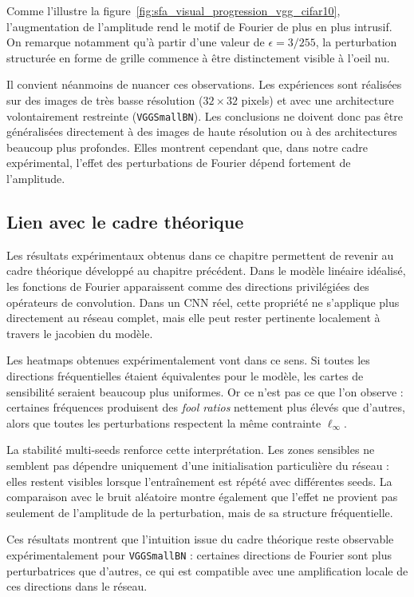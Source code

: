 Comme l'illustre la figure~\ref{fig:sfa_visual_progression_vgg_cifar10}, l'augmentation de l'amplitude rend le motif de 
Fourier de plus en plus intrusif. On remarque notamment qu'à partir d'une valeur de $\epsilon = 3/255$, la perturbation 
structurée en forme de grille commence à être distinctement visible à l'oeil nu. 

Il convient néanmoins de nuancer ces observations. Les expériences sont réalisées sur des images de
très basse résolution ($32\times32$ pixels) et avec une architecture volontairement restreinte
(\texttt{VGGSmallBN}). Les conclusions ne doivent donc pas être généralisées directement à des images
de haute résolution ou à des architectures beaucoup plus profondes. Elles montrent cependant que,
dans notre cadre expérimental, l'effet des perturbations de Fourier dépend fortement de l'amplitude.

\subsection{Lien avec le cadre théorique}
\label{subsec:discussion_lien_cadre_theorique}

Les résultats expérimentaux obtenus dans ce chapitre permettent de revenir au cadre théorique
développé au chapitre précédent. Dans le modèle linéaire idéalisé, les fonctions de Fourier apparaissent
comme des directions privilégiées des opérateurs de convolution. Dans un CNN réel, cette propriété
ne s'applique plus directement au réseau complet, mais elle peut rester pertinente localement à travers
le jacobien du modèle.

Les heatmaps obtenues expérimentalement vont dans ce sens. Si toutes les directions fréquentielles
étaient équivalentes pour le modèle, les cartes de sensibilité seraient beaucoup plus uniformes. Or ce
n'est pas ce que l'on observe : certaines fréquences produisent des \textit{fool ratios} nettement plus
élevés que d'autres, alors que toutes les perturbations respectent la même contrainte $\ell_\infty$.

La stabilité multi-seeds renforce cette interprétation. Les zones sensibles ne semblent pas dépendre
uniquement d'une initialisation particulière du réseau : elles restent visibles lorsque l'entraînement est
répété avec différentes seeds. La comparaison avec le bruit aléatoire montre également que l'effet ne
provient pas seulement de l'amplitude de la perturbation, mais de sa structure fréquentielle.

Ces résultats montrent que l'intuition issue du cadre théorique reste
observable expérimentalement pour \texttt{VGGSmallBN} : certaines directions de Fourier sont plus perturbatrices que d'autres,
ce qui est compatible avec une amplification locale de ces directions dans le réseau.

